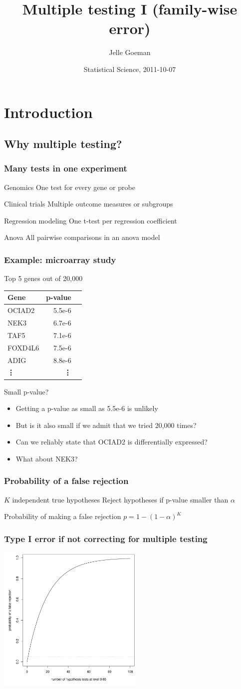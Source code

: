 \documentclass[compress]{beamer}
\title{Multiple testing I (family-wise error)}
\author{Jelle Goeman}
\date{Statistical Science, 2011-10-07}
\newcommand{\bb}[1]{\begin{block}{#1}}
\newcommand{\eb}{\end{block}}
\newcommand{\bi}{\begin {itemize}}
\newcommand{\ei}{\end{itemize}}
\newcommand{\bfr}[1]{\begin{frame} \frametitle{#1}}
\begin{document}
\begin{frame}
  \titlepage
\end{frame}

\section{Introduction}
\subsection{Why multiple testing?}

\bfr{Many tests in one experiment}
  \bb{Genomics}
    One test for every gene or probe
  \eb
  \bb{Clinical trials}
    Multiple outcome measures or subgroups
  \eb
  \bb{Regression modeling}
    One t-test per regression coefficient
  \eb
  \bb{Anova}
    All pairwise comparisons in an anova model
  \eb
\end{frame}


\bfr{Example: microarray study}
  \bb{Top 5 genes out of 20,000}
    {\scriptsize\begin{tabular}{lrr}
    Gene & p-value  \\ \hline
  OCIAD2 &5.5e-6  \\
    NEK3 &6.7e-6  \\
    TAF5 &7.1e-6  \\
 FOXD4L6 &7.5e-6  \\
    ADIG &8.8e-6  \\
  \textbf{\vdots} & \textbf{\vdots} \\\hline
  \end{tabular}}
  \eb
  \bb{Small p-value?}
    \bi
      \item Getting a p-value as small as 5.5e-6 is unlikely
      \item But is it also small if we admit that we tried 20,000 times?
      \item Can we reliably state that OCIAD2 is differentially expressed?
      \item What about NEK3?
    \ei
  \eb
\end{frame}

\bfr{Probability of a false rejection}
  \bb{$K$ independent true hypotheses}
    Reject hypotheses if p-value smaller than $\alpha$
  \eb
  \bb{Probability of making a false rejection}
    $p = 1- (1-\alpha)^K$
  \eb
\end{frame}

\bfr{Type I error if not correcting for multiple testing}%
\includegraphics[height=7cm]{plaatjes/typeI}
\end{frame}
\end{document}
